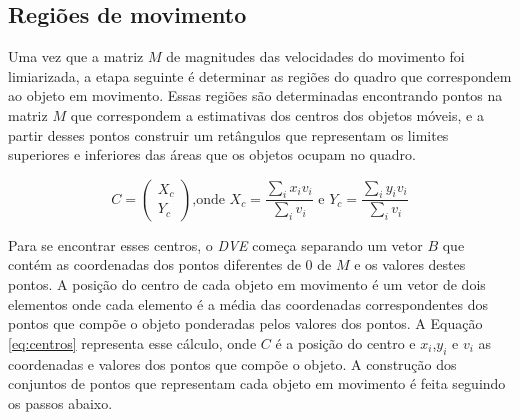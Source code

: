 \subsection{Regiões de movimento}\label{sec:sub:regioesmovimento}

Uma vez que a matriz $M$ de magnitudes das velocidades do movimento foi limiarizada, a etapa seguinte é determinar as regiões do quadro que correspondem ao objeto em movimento. Essas regiões são determinadas encontrando pontos na matriz $M$ que correspondem a estimativas dos centros dos objetos móveis, e a partir desses pontos construir um retângulos que representam os limites superiores e inferiores das áreas que os objetos ocupam no quadro.

\begin{equation}
C=\begin{pmatrix}
X_c\\Y_c
\end{pmatrix}
\text{,onde } 
X_c = \frac{\sum_i x_iv_i}{\sum_iv_i}
\text{ e }
Y_c = \frac{\sum_i y_iv_i}{\sum_iv_i}
\label{eq:centros}
\end{equation}

Para se encontrar esses centros, o \textit{DVE} começa separando um vetor $B$ que contém as coordenadas dos pontos diferentes de $0$ de $M$ e os valores destes pontos. A posição do centro de cada objeto em movimento é um vetor de dois elementos onde cada elemento é a média das coordenadas correspondentes dos pontos que compõe o objeto ponderadas pelos valores dos pontos. A Equação \ref{eq:centros} representa esse cálculo, onde $C$ é a posição do centro e $x_i$,$y_i$ e $v_i$ as coordenadas e valores dos pontos que compõe o objeto. A construção dos conjuntos de pontos que representam cada objeto em movimento é feita seguindo os passos abaixo.

